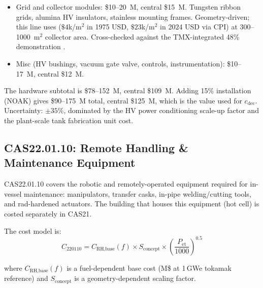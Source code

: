 \documentclass{article}
\begin{document}
\begin{itemize}
    Cu-CrZr / W elements at the 16\,MW beam-line scale.  Public
    procurement values for the ITER beam-dump components are not
    disclosed; the dollar figure here is an order-of-magnitude
    estimate scaled by area and heat flux.  ITER divertor pricing
    ($\$60$M/GW${}_\text{th}$) is overspec, since VB grids are not
    exposed to direct fusion plasma or 14~MeV neutron flux.
  \item Grid and collector modules: \$10--20~M, central \$15~M.
    Tungsten ribbon grids, alumina HV insulators, stainless
    mounting frames.  Geometry-driven; this line uses
    \citet{hoffman1977} ($\$4$k/m${}^2$ in 1975 USD, $\$23$k/m${}^2$
    in 2024 USD via CPI) at 300--1000~m${}^2$ collector area.
    Cross-checked against the TMX-integrated 48\% demonstration
    \citep{barr_moir1983}.
  \item Misc (HV bushings, vacuum gate valve, controls, instrumentation):
    \$10--17~M, central \$12~M.
\end{itemize}

The hardware subtotal is \$78--152~M, central \$109~M.  Adding 15\%
installation (NOAK) gives \$90--175~M total, central \$125~M, which
is the value used for $c_{\text{dec}}$.  Uncertainty: $\pm 35\%$,
dominated by the HV power conditioning scale-up factor and the
plant-scale tank fabrication unit cost.

\subsection{CAS22.01.10: Remote Handling \& Maintenance Equipment}
\label{sec:cas2210}

CAS22.01.10 covers the robotic and remotely-operated equipment required
for in-vessel maintenance: manipulators, transfer casks, in-pipe
welding/cutting tools, and rad-hardened actuators. The building that
houses this equipment (hot cell) is costed separately in CAS21.

The cost model is:
\begin{equation}
\label{eq:cas2210}
C_{220110} = C_{\text{RH,base}}(f) \times S_{\text{concept}}
             \times \left(\frac{P_{\text{et}}}{1000}\right)^{0.5}
\end{equation}

\noindent where $C_{\text{RH,base}}(f)$ is a fuel-dependent base cost
(M\$ at 1\,GWe tokamak reference) and $S_{\text{concept}}$ is a
geometry-dependent scaling factor.
\end{document}
